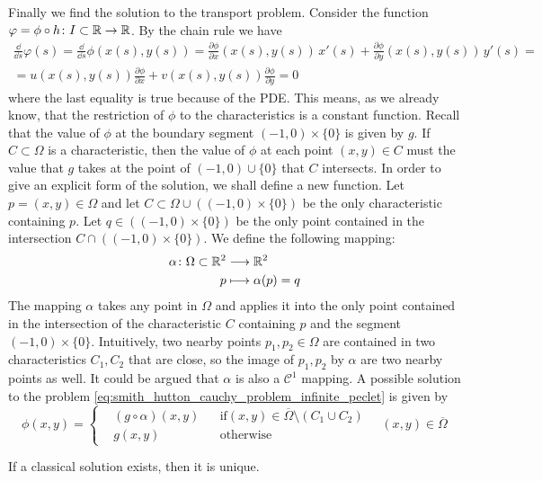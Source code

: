Finally we find the solution to the transport problem. Consider the function
$\varphi = \phi \circ h \colon I \subset \mathbb{R} \to \mathbb{R}$. By the chain rule we
have
\begin{multline}
	\frac{\dd}{\dd{s}} \varphi(s) = 
	\frac{\dd}{\dd{s}} \phi(x(s), y(s)) = 
	\frac{\partial \phi}{\partial x} (x(s), y(s)) \, x'(s) + 
	\frac{\partial \phi}{\partial y} (x(s), y(s)) \, y'(s) = \\ =
	u(x(s),y(s)) \frac{\partial \phi}{\partial x} + 
	v(x(s),y(s)) \frac{\partial \phi}{\partial y} = 0
\end{multline}
where the last equality is true because of the PDE. This means, as we already
know, that the restriction of $\phi$ to the characteristics is a constant
function. Recall that the value of $\phi$ at the boundary segment $(-1,0) \times
\{ 0 \}$ is given by $g$. If $C \subset \Omega$ is a characteristic, then the
value of $\phi$ at each point $(x,y) \in C$ must the value that $g$ takes at the
point of $(-1,0) \cup \{ 0 \}$ that $C$ intersects. In order to give an explicit
form of the solution, we shall define a new function. Let $p = (x,y) \in \Omega$
and let $C \subset \Omega \cup ((-1,0) \times \{ 0 \})$ be the only
characteristic containing $p$. Let $q \in ((-1,0) \times \{ 0 \})$ be the only
point contained in the intersection $C \cap ((-1,0) \times \{ 0 \})$. We define
the following mapping:
\begin{equation}
	\begin{aligned}
		\alpha \colon \Omega \subset \mathbb{R}^2 &\longrightarrow \mathbb{R}^2 \\
		p &\longmapsto \alpha(p) = q
	\end{aligned}
\end{equation}
The mapping $\alpha$ takes any point in $\Omega$ and applies it into the only
point contained in the intersection of the characteristic $C$ containing $p$ and
the segment $(-1,0) \times \{ 0 \}$. Intuitively, two nearby points $p_1, p_2
\in \Omega$ are contained in two characteristics $C_1, C_2$ that are close, so
the image of $p_1, p_2$ by $\alpha$ are two nearby points as well. It could be
argued that $\alpha$ is also a $\mathcal{C}^1$ mapping. A possible solution to
the problem \eqref{eq:smith_hutton_cauchy_problem_infinite_peclet} is given by
\begin{equation}
	\phi(x,y) = 
	\left\{
	\begin{aligned}
		&(g \circ \alpha)(x,y) & &\text{if} (x,y) \in \overline{\Omega} \setminus (C_1 \cup C_2) \\
		&g(x,y) & &\text{otherwise}
	\end{aligned}
	\right.
	\quad (x,y) \in \overline{\Omega}
\end{equation}

\begin{theorem}
	If a classical solution exists, then it is unique.
\end{theorem}